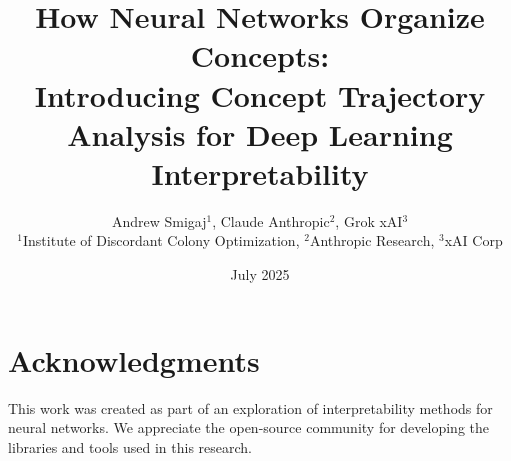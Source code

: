 \documentclass[11pt,a4paper]{article}
\title{How Neural Networks Organize Concepts:\\
Introducing Concept Trajectory Analysis for Deep Learning Interpretability}
\author{Andrew Smigaj$^1$, Claude Anthropic$^2$, Grok xAI$^3$ \\
$^1$Institute of Discordant Colony Optimization, $^2$Anthropic Research, $^3$xAI Corp}
\date{July 2025}
\begin{document}
\maketitle
























\section*{Acknowledgments}
This work was created as part of an exploration of interpretability methods for neural networks. We appreciate the open-source community for developing the libraries and tools used in this research.



\end{document}

